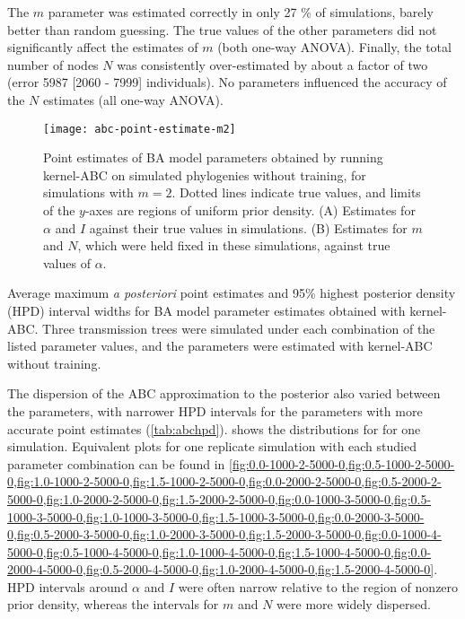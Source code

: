 The $m$ parameter was estimated correctly in only
    27 \%
of simulations, barely better than random guessing. The true values of the
other parameters did not significantly affect the estimates of $m$ (both
one-way ANOVA). Finally, the total number of nodes $N$ was consistently
over-estimated by about a factor of two
    (error 5987 
    [2060 - 
     7999] individuals).
No parameters influenced the accuracy of the $N$ estimates (all one-way ANOVA).

\begin{figure}[ht]
  \centering
  \texttt{[image: abc-point-estimate-m2]}
  \vspace{6pt}
  \caption{
    Point estimates of BA model parameters obtained by running kernel-ABC
    on simulated phylogenies without training, for simulations with $m = 2$.
    Dotted lines indicate true values, and limits of the $y$-axes are regions
    of uniform prior density. (A) Estimates for $\alpha$ and $I$ against their
    true values in simulations. (B) Estimates for $m$ and $N$, which were held
    fixed in these simulations, against true values of $\alpha$.
  }
  \label{fig:abcpt}
\end{figure}

\begin{table*}[ht]
  \centering
  
  \caption{
      Average maximum \textit{a posteriori} point estimates and 95\% highest
      posterior density (HPD) interval widths for BA model parameter estimates
      obtained with kernel-ABC. Three transmission trees were simulated under
      each combination of the listed parameter values, and the parameters were
      estimated with kernel-ABC without training.
  }
  \label{tab:abchpd}
\end{table*}



The dispersion of the ABC approximation to the posterior also varied between
the parameters, with narrower HPD intervals for the parameters with more
accurate point estimates (\cref{tab:abchpd}).  shows
the distributions for for one simulation. Equivalent plots for one replicate
simulation with each studied parameter combination can be found in
\cref{fig:0.0-1000-2-5000-0,fig:0.5-1000-2-5000-0,fig:1.0-1000-2-5000-0,fig:1.5-1000-2-5000-0,fig:0.0-2000-2-5000-0,fig:0.5-2000-2-5000-0,fig:1.0-2000-2-5000-0,fig:1.5-2000-2-5000-0,fig:0.0-1000-3-5000-0,fig:0.5-1000-3-5000-0,fig:1.0-1000-3-5000-0,fig:1.5-1000-3-5000-0,fig:0.0-2000-3-5000-0,fig:0.5-2000-3-5000-0,fig:1.0-2000-3-5000-0,fig:1.5-2000-3-5000-0,fig:0.0-1000-4-5000-0,fig:0.5-1000-4-5000-0,fig:1.0-1000-4-5000-0,fig:1.5-1000-4-5000-0,fig:0.0-2000-4-5000-0,fig:0.5-2000-4-5000-0,fig:1.0-2000-4-5000-0,fig:1.5-2000-4-5000-0}. HPD intervals around $\alpha$ and $I$ were often narrow
relative to the region of nonzero prior density, whereas the intervals for $m$
and $N$ were more widely dispersed.

